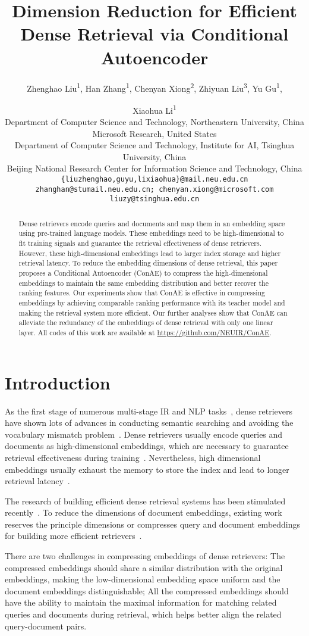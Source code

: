 \documentclass[11pt]{article}
\title{Dimension Reduction for Efficient Dense Retrieval via Conditional Autoencoder}
\author{Zhenghao Liu\textsuperscript{1}, 
        Han Zhang\textsuperscript{1}, 
        Chenyan Xiong\textsuperscript{2}, 
        Zhiyuan Liu\textsuperscript{3},
        Yu Gu\textsuperscript{1},
        \and Xiaohua Li\textsuperscript{1}\\
        Department of Computer Science and Technology, Northeastern University, China \\
        Microsoft Research, United States \\
        Department of Computer Science and Technology, Institute for AI, Tsinghua University, China \\
        Beijing National Research Center for Information Science and Technology, China \\
        \texttt{\{liuzhenghao,guyu,lixiaohua\}@mail.neu.edu.cn}\\
        \texttt{zhanghan@stumail.neu.edu.cn; chenyan.xiong@microsoft.com}\\
        \texttt{liuzy@tsinghua.edu.cn}}
\begin{document}
\maketitle
\begin{abstract}
Dense retrievers encode queries and documents and map them in an embedding space using pre-trained language models. These embeddings need to be high-dimensional to fit training signals and guarantee the retrieval effectiveness of dense retrievers. However, these high-dimensional embeddings lead to larger index storage and higher retrieval latency. To reduce the embedding dimensions of dense retrieval, this paper proposes a Conditional Autoencoder (ConAE) to compress the high-dimensional embeddings to maintain the same embedding distribution and better recover the ranking features. Our experiments show that ConAE is effective in compressing embeddings by achieving comparable ranking performance with its teacher model and making the retrieval system more efficient. Our further analyses show that ConAE can alleviate the redundancy of the embeddings of dense retrieval with only one linear layer. All codes of this work are available at \url{https://github.com/NEUIR/ConAE}.
\end{abstract}
\section{Introduction}
As the first stage of numerous multi-stage IR and NLP tasks~\cite{nogueira2019document,chen2017reading,thorne2018fact}, dense retrievers~\cite{xiong2020approximate} have shown lots of advances in conducting semantic searching and avoiding the vocabulary mismatch problem~\cite{robertson2009probabilistic}. Dense retrievers usually encode queries and documents as high-dimensional embeddings, which are necessary to guarantee retrieval effectiveness during training~\cite{ma2021simple,reimers2021curse}. Nevertheless, high dimensional embeddings usually exhaust the memory to store the index and lead to longer retrieval latency~\cite{indyk1998approximate,meiser1993point}.


The research of building efficient dense retrieval systems has been stimulated recently~\cite{effecientqa}. To reduce the dimensions of document embeddings, existing work reserves the principle dimensions or compresses query and document embeddings for building more efficient retrievers~\cite{yang2021designing,ma2021simple}.

There are two challenges in compressing embeddings of dense retrievers: The compressed embeddings should share a similar distribution with the original embeddings, making the low-dimensional embedding space uniform and the document embeddings distinguishable; All the compressed embeddings should have the ability to maintain the maximal information for matching related queries and documents during retrieval, which helps better align the related query-document pairs.
\end{document}
